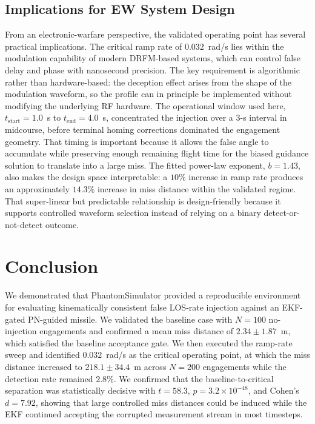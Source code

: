 \documentclass[journal]{IEEEtran}
\begin{document}
\subsection{Implications for EW System Design}
From an electronic-warfare perspective, the validated operating point
has several practical implications.  The critical ramp rate of
$0.032$~rad/s lies within the modulation capability of modern
DRFM-based systems, which can control false delay and phase with
nanosecond precision.  The key requirement is algorithmic rather than
hardware-based: the deception effect arises from the shape of the
modulation waveform, so the profile can in principle be implemented
without modifying the underlying RF hardware.  The operational window
used here, $t_{\mathrm{start}} = 1.0$~s to $t_{\mathrm{end}} = 4.0$~s,
concentrated the injection over a 3-s interval in midcourse, before
terminal homing corrections dominated the engagement geometry.  That
timing is important because it allows the false angle to accumulate
while preserving enough remaining flight time for the biased guidance
solution to translate into a large miss.  The fitted power-law
exponent, $b = 1.43$, also makes the design space interpretable: a
$10\%$ increase in ramp rate produces an approximately $14.3\%$
increase in miss distance within the validated regime.  That
super-linear but predictable relationship is design-friendly because it
supports controlled waveform selection instead of relying on a
binary detect-or-not-detect outcome.

\section{Conclusion}
\label{sec:conclusion}

We demonstrated that PhantomSimulator provided a reproducible
environment for evaluating kinematically consistent false LOS-rate
injection against an EKF-gated PN-guided missile.  We validated the
baseline case with $N=100$ no-injection engagements and confirmed a
mean miss distance of $2.34 \pm 1.87$~m, which satisfied the baseline
acceptance gate.  We then executed the ramp-rate sweep and identified
$0.032$~rad/s as the critical operating point, at which the miss
distance increased to $218.1 \pm 34.4$~m across $N=200$ engagements
while the detection rate remained $2.8\%$.  We confirmed that the
baseline-to-critical separation was statistically decisive with
$t = 58.3$, $p = 3.2\times10^{-48}$, and Cohen's $d = 7.92$, showing
that large controlled miss distances could be induced while the EKF
continued accepting the corrupted measurement stream in most
timesteps.
\end{document}
